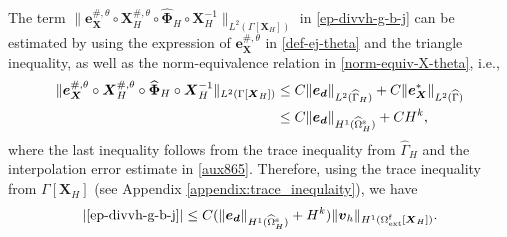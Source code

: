 \documentclass[11pt,reqno]{amsart}
\theoremstyle{definition}
\theoremstyle{plain}
\numberwithin{theorem}{section}
\numberwithin{proposition}{section}
\numberwithin{lemma}{section}
\numberwithin{equation}{section}
\newcommand{\bs}[1]{\boldsymbol{#1}}
\renewcommand{\(}{\bigl(}
\renewcommand{\)}{\bigr)}
\begin{document}
The term $\|{\bs e}_{\bs X}^{\#,\theta}\circ{\bs X}_H^{\#,\theta}\circ\widehat{\bs\Phi}_H \circ{\bs X}_H^{-1}\|_{L^2(\Gamma[\bs X_H])}$ in \eqref{ep-divvh-g-b-j} can be estimated by using the expression of ${\bs e}_{\bs X}^{\#,\theta}$ in \eqref{def-ej-theta} and the triangle inequality, as well as the norm-equivalence relation in \eqref{norm-equiv-X-theta}, i.e., 
\begin{align*}
\|{\bs e}_{\bs X}^{\#,\theta}\circ{\bs X}_H^{\#,\theta}\circ\widehat{\bs\Phi}_H \circ{\bs X}_H^{-1}\|_{L^2(\Gamma[\bs X_H])}
&\le C\|{\bs e}_{\bs d}\|_{L^2(\widehat\Gamma_H)} 
 + C\|{\bs e}_{\bs X}^*\|_{L^2(\widehat\Gamma)} \\
&\le C\|{\bs e}_{\bs d}\|_{H^1(\widehat\Omega^{\rm s}_H)} + CH^k ,
\end{align*}
where the last inequality follows from the trace inequality from $\widehat\Gamma_H$ and the interpolation error estimate in \eqref{aux865}. Therefore, using the trace inequality from $\Gamma[\bs X_H]$ (see Appendix \ref{appendix:trace_inequlaity}), we have 
\begin{align}\label{ep-divvh-g-b-j1}
|\eqref{ep-divvh-g-b-j}|
\le C(\|{\bs e}_{\bs d}\|_{H^1(\widehat\Omega^{\rm s}_H)}  + H^k)\|{\bs v}_h\|_{H^1(\Omega^{\rm f}_{\rm ext}[\bs X_H])} . 
\end{align}
\end{document}
